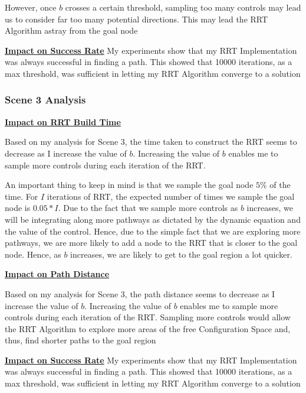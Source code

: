 \documentclass{article}
\begin{document}
However, once $b$ crosses a certain threshold, sampling too many controls may lead us to consider far too many potential directions. This may lead the RRT Algorithm astray from the goal node \newline 

\textbf{\underline{Impact on Success Rate}} \newline
My experiments show that my RRT Implementation was always successful in finding a path. This showed that 10000 iterations, as a max threshold, was sufficient in letting my RRT Algorithm converge to a solution

\subsubsection{Scene 3 Analysis}
\textbf{\underline{Impact on RRT Build Time}} \newline

Based on my analysis for Scene 3, the time taken to construct the RRT seems to decrease as I increase the value of $b$. Increasing the value of $b$ enables me to sample more controls during each iteration of the RRT. \newline 

An important thing to keep in mind is that we sample the goal node $5\%$ of the time. For $I$ iterations of RRT, the expected number of times we sample the goal node is $0.05 * I$. Due to the fact that we sample more controls as $b$ increases, we will be integrating along more pathways as dictated by the dynamic equation and the value of the control. Hence, due to the simple fact that we are exploring more pathways, we are more likely to add a node to the RRT that is closer to the goal node. Hence, as $b$ increases, we are likely to get to the goal region a lot quicker. \newline 


\textbf{\underline{Impact on Path Distance}} \newline

Based on my analysis for Scene 3, the path distance seems to decrease as I increase the value of $b$. Increasing the value of $b$ enables me to sample more controls during each iteration of the RRT. Sampling more controls would allow the RRT Algorithm to explore more areas of the free Configuration Space and, thus, find shorter paths to the goal region \newline 

\textbf{\underline{Impact on Success Rate}} \newline
My experiments show that my RRT Implementation was always successful in finding a path. This showed that 10000 iterations, as a max threshold, was sufficient in letting my RRT Algorithm converge to a solution
\end{document}

